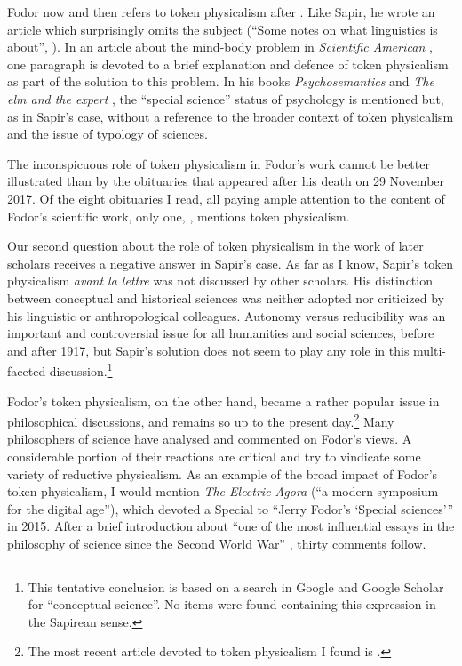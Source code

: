 \documentclass[output=paper]{langscibook}
\begin{document}
Fodor now and then refers to token physicalism after \citeyear{Fodor1975}. Like Sapir, he wrote an article which surprisingly omits the subject (``Some notes on what linguistics is about'', \citeyear{Fodor1985}). In an article about the mind-body problem in \emph{Scientific American} \citep{Fodor1981}, one paragraph is devoted to a brief explanation and defence of token physicalism as part of the solution to this problem. In his books \emph{Psychosemantics} \citep[5--6]{Fodor1987} and \emph{The elm and the expert} \citep[39]{Fodor1994}, the ``special science'' status of psychology is mentioned but, as in Sapir's case, without a reference to the broader context of token physicalism and the issue of typology of sciences.

The inconspicuous role of token physicalism in Fodor's work cannot be better illustrated than by the obituaries that appeared after his death on 29 November 2017. Of the eight obituaries I read, all paying ample attention to the content of Fodor's scientific work, only one, \citet{Rey2017}, mentions token physicalism.

Our second question about the role of token physicalism in the work of later scholars receives a negative answer in Sapir's case. As far as I know, Sapir's token physicalism \emph{avant la lettre} was not discussed by other scholars. His distinction between conceptual and historical sciences was neither adopted nor criticized by his linguistic or anthropological colleagues. Autonomy versus reducibility was an important and controversial issue for all humanities and social sciences, before and after 1917, but Sapir's solution does not seem to play any role in this multi-faceted discussion.\footnote{This tentative conclusion is based on a search in Google and Google Scholar for ``conceptual science''. No items were found containing this expression in the Sapirean sense.}

Fodor's token physicalism, on the other hand, became a rather popular issue in philosophical discussions, and remains so up to the present day.\footnote{The most recent article devoted to token physicalism I found is \citet{DiFrisco2017}.} Many philosophers of science have analysed and commented on Fodor's views. A considerable portion of their reactions are critical and try to vindicate some variety of reductive physicalism. As an example of the broad impact of Fodor's token physicalism, I would mention \emph{The Electric Agora} (``a modern symposium for the digital age''), which devoted a Special to ``Jerry Fodor's `Special sciences''' in 2015. After a brief introduction about ``one of the most influential essays in the philosophy of science since the Second World War'' \citep[1--2]{Kaufman2015}, thirty comments follow.
\end{document}
